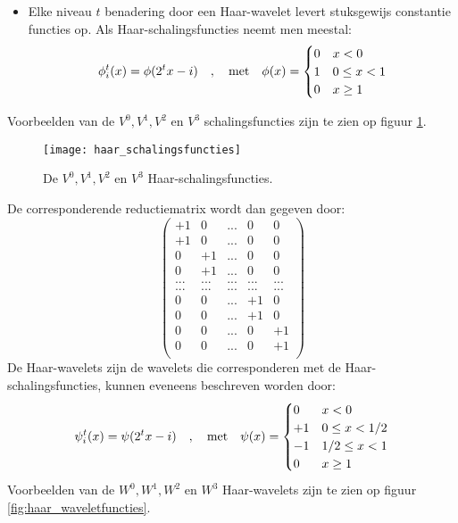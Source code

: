 \documentclass{report}
\begin{document}
\begin{enumerate}
	{
		\begin{itemize}
			\item Elke niveau $t$ benadering door een Haar-wavelet levert stuksgewijs constantie functies op. Als Haar-schalingsfuncties neemt men meestal:
		$$\phi_i^t(x) = \phi(2^tx - i)\quad,\quad\hbox{met}\quad \phi(x) = 
			\begin{cases}
				0 & x < 0 \\
				1 & 0 \leq x < 1 \\
				0 & x \geq 1
			\end{cases}$$
		\end{itemize}
		Voorbeelden van de $V^0, V^1, V^2$ en $V^3$ schalingsfuncties zijn te zien op figuur \ref{fig:haar_schalingsfuncties}.
		\begin{figure}[ht]
			\centering
			\texttt{[image: haar\_schalingsfuncties]}
			\caption{De $V^0, V^1, V^2$ en $V^3$ Haar-schalingsfuncties.}
			\label{fig:haar_schalingsfuncties}
		\end{figure}
		De corresponderende reductiematrix wordt dan gegeven door:
		$$
		\begin{pmatrix}
			+1 & 0 & ... & 0 & 0 \\
			+1 & 0 & ... & 0 & 0 \\
			0 & +1 &  ... & 0 & 0 \\
			0 & +1 &  ... & 0 & 0 \\
			... & ... & ... & ... & ... \\
			... & ... & ... & ... & ... \\
		 	0 & 0 & ... & +1 & 0  \\
		 	0 & 0 & ... & +1 & 0  \\
		 	0 & 0 & ... & 0 & +1  \\
		 	0 & 0 & ... & 0 & +1  \\
		\end{pmatrix}
		$$
		De Haar-wavelets zijn de wavelets die corresponderen met de Haar-schalingsfuncties, kunnen eveneens beschreven worden door:
		$$\psi_i^t(x) = \psi(2^tx - i)\quad,\quad\hbox{met}\quad \psi(x) = \begin{cases}
			0 & x < 0 \\
			+ 1 & 0 \leq x < 1/2 \\
			-1 & 1/2 \leq x < 1 \\
			0 & x \geq 1
		\end{cases}$$
		Voorbeelden van de $W^0, W^1, W^2$ en $W^3$ Haar-wavelets zijn te zien op figuur \ref{fig:haar_waveletfuncties}.
}
\end{enumerate}
\end{document}
